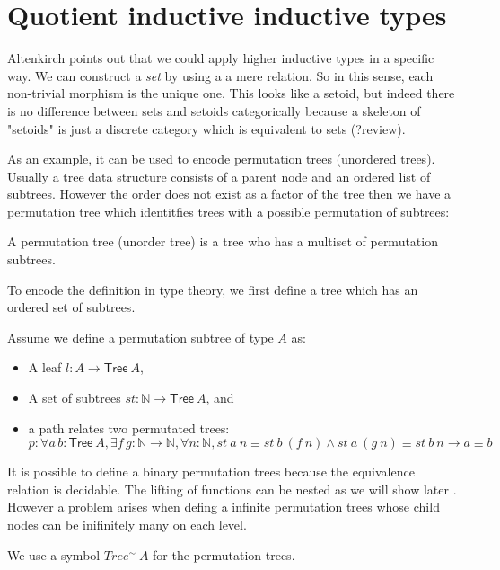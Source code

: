 \section{Quotient inductive inductive types}

Altenkirch points out that we could apply higher inductive types in a
specific way. We can construct a \emph{set} by using a a mere
relation. So in this sense, each non-trivial morphism is the unique
one. This looks like a setoid, but indeed there is no difference
between sets and setoids categorically because a skeleton of "setoids"
is just a discrete category which is equivalent to sets (?review).

As an example, it can be used to encode permutation trees (unordered trees). Usually a
tree data structure consists of a parent node and an ordered list of
subtrees. However the order does not exist as a factor of the
tree then we have a permutation tree which identitfies trees with a
possible permutation of subtrees:


\begin{definition}
A permutation tree (unorder tree) is a tree who has a
multiset of permutation subtrees.
\end{definition}


To encode the definition in type theory, we first define a tree which
has an ordered set of subtrees.

Assume we define a permutation subtree of type $A$ as:

\begin{itemize}
\item A leaf $l: A \rightarrow \mathsf{Tree}~A$, 
\item A set of subtrees $st : \mathbb{N} \rightarrow \mathsf{Tree}~A$,
  and
\item a path relates two permutated trees:
$p : \forall a\,b: \mathsf{Tree}~A, \exists f\,g: \mathbb{N} \rightarrow \mathbb{N},
\forall n: \mathbb{N}, st~a~n  \equiv st~b~(f~n) \wedge st~a~(g~n)
\equiv st~b~n \rightarrow a \equiv b$
\end{itemize}


It is possible to define a binary permutation trees because the
equivalence relation is decidable. The lifting of functions can be
nested as we will show later \todo{}.
However a problem arises when defing a infinite permutation trees
whose child nodes can be inifinitely many on each level.

We use a symbol $Tree^{\sim}~A$ for the permutation trees.

